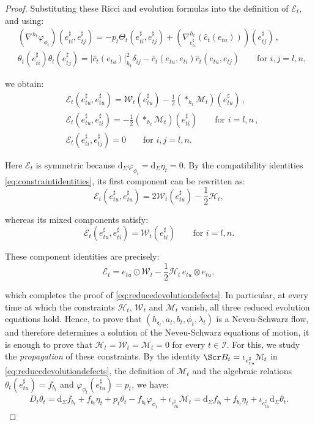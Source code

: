 \documentclass[10pt,reqno,a4paper]{amsart}
\theoremstyle{plain}
\theoremstyle{definition}
\theoremstyle{remark}
\theoremstyle{remark}
\def\dd{\mathrm{d}}
\def\cB{\Scr B}
\def\cH{\mathcal{H}}
\def\cE{\mathcal{E}}
\def\cI{\mathcal{I}}
\def\cM{\mathcal{M}}
\def\cW{\mathcal{W}}
\def\cH{\mathcal{H}}
\def\fre{\mathfrak{e}}
\renewcommand{\(}{ (}
\renewcommand{\)}{ )}
\begin{document}
\begin{proof}
\noindent
Substituting these Ricci and evolution formulas into the definition of $\cE_t$, and using:
\begin{eqnarray*}
& (\nabla^{h_t}\varphi_{\phi_t})
(e^{\sharp}_{ti},e^{\sharp}_{tj})
=-p_t\Theta_t(e^{\sharp}_{ti},e^{\sharp}_{tj})
+ (\nabla^{h_t}_{e^{\sharp}_{ti}}
(\widehat{c}_t(e_{tu})) )(e^{\sharp}_{tj})\, ,\\
& \theta_t(e^{\sharp}_{ti})\theta_t(e^{\sharp}_{tj})
=\vert\widehat{c}_t(e_{tu})\vert_{h_t}^2\delta_{ij}
-\widehat{c}_t(e_{tu},e_{ti})
\widehat{c}_t(e_{tu},e_{tj})
\qquad\text{for }i,j=l,n,
\end{eqnarray*}

\noindent
we obtain:
\begin{eqnarray*}
& \cE_t(e^{\sharp}_{tu},e^{\sharp}_{tu})
=\cW_t(e^{\sharp}_{tu})
-\frac{1}{2}(\ast_{h_t}\cM_t)(e^{\sharp}_{tu})\, ,\\
& \cE_t(e^{\sharp}_{tu},e^{\sharp}_{ti})
=-\frac{1}{2}(\ast_{h_t}\cM_t)(e^{\sharp}_{ti})
\qquad\text{for }i=l,n\, ,\\
& \cE_t(e^{\sharp}_{ti},e^{\sharp}_{tj})=0
\qquad\text{for }i,j=l,n.
\end{eqnarray*}

\noindent
Here $\cE_t$ is symmetric because
$\dd_{\Sigma}\varphi_{\phi_t}=\dd_{\Sigma}\eta_t=0$.
By the compatibility identities \eqref{eq:constraintidentities}, its first component can be rewritten as:
\begin{equation*}
\cE_t(e^{\sharp}_{tu},e^{\sharp}_{tu})
=2\cW_t(e^{\sharp}_{tu})-\frac{1}{2}\cH_t,
\end{equation*}

\noindent
whereas its mixed components satisfy:
\begin{equation*}
\cE_t(e^{\sharp}_{tu},e^{\sharp}_{ti})
=\cW_t(e^{\sharp}_{ti})
\qquad\text{for }i=l,n.
\end{equation*}

\noindent
These component identities are precisely:
\begin{equation*}
\cE_t=e_{tu}\odot\cW_t
-\frac{1}{2}\cH_t\,e_{tu}\otimes e_{tu},
\end{equation*}

\noindent
which completes the proof of \eqref{eq:reducedevolutiondefects}. In particular, at every time at which the constraints
$\cH_t$, $\cW_t$ and $\cM_t$ vanish, all three reduced evolution equations hold. Hence, to prove that $(h_{\fre_t}, a_t , b_t,\phi_t,\lambda_t)$ is a Neveu-Schwarz flow, and therefore determines a solution of the Neveu-Schwarz equations of motion, it is enough to prove that $\cH_t=\cW_t=\cM_t = 0$ for every $t\in \cI$. For this, we study the \emph{propagation} of these constraints. By the identity $\cB_t=\iota_{e^{\sharp}_{tu}}\cM_t$ in \eqref{eq:reducedevolutiondefects}, the definition of $\cM_t$ and the algebraic relations $\theta_t(e^{\sharp}_{tu})=f_{b_t}$ and $\varphi_{\phi_t}(e^{\sharp}_{tu})=p_t$, we have:
\begin{eqnarray*}
D_t\theta_t = \dd_{\Sigma}f_{b_t} +f_{b_t}\eta_t+p_t\theta_t-f_{b_t}\varphi_{\phi_t}
+\iota_{e^{\sharp}_{tu}}\cM_t = \dd_{\Sigma}f_{b_t} +f_{b_t}\eta_t
+\iota_{e^{\sharp}_{tu}}\dd_{\Sigma}\theta_t.
\end{eqnarray*}


\end{proof}
\end{document}
